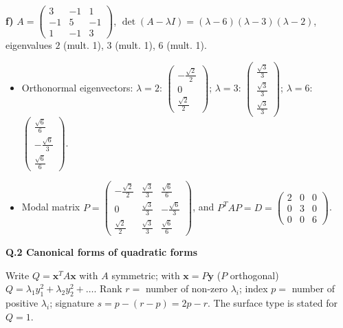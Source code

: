 \noindent\textbf{f)} $A=\begin{pmatrix}3 & -1 & 1 \\ -1 & 5 & -1 \\ 1 & -1 & 3\end{pmatrix}$, $\det(A-\lambda I)=\left(\lambda - 6\right) \left(\lambda - 3\right) \left(\lambda - 2\right)$, eigenvalues $2$ (mult. 1), $3$ (mult. 1), $6$ (mult. 1).
\begin{itemize}\item Orthonormal eigenvectors: $\lambda=2$: $\begin{pmatrix}- \frac{\sqrt{2}}{2} \\ 0 \\ \frac{\sqrt{2}}{2}\end{pmatrix}$; $\lambda=3$: $\begin{pmatrix}\frac{\sqrt{3}}{3} \\ \frac{\sqrt{3}}{3} \\ \frac{\sqrt{3}}{3}\end{pmatrix}$; $\lambda=6$: $\begin{pmatrix}\frac{\sqrt{6}}{6} \\ - \frac{\sqrt{6}}{3} \\ \frac{\sqrt{6}}{6}\end{pmatrix}$.
\item Modal matrix $P=\begin{pmatrix}- \frac{\sqrt{2}}{2} & \frac{\sqrt{3}}{3} & \frac{\sqrt{6}}{6} \\ 0 & \frac{\sqrt{3}}{3} & - \frac{\sqrt{6}}{3} \\ \frac{\sqrt{2}}{2} & \frac{\sqrt{3}}{3} & \frac{\sqrt{6}}{6}\end{pmatrix}$, and $P^TAP=D=\begin{pmatrix}2 & 0 & 0 \\ 0 & 3 & 0 \\ 0 & 0 & 6\end{pmatrix}$.\end{itemize}
\medskip\noindent\textbf{Q.2  Canonical forms of quadratic forms}\par\smallskip
Write $Q=\mathbf x^TA\mathbf x$ with $A$ symmetric; with $\mathbf x=P\mathbf y$ ($P$ orthogonal) $Q=\lambda_1y_1^2+\lambda_2y_2^2+\dots$. Rank $r=$ number of non-zero $\lambda_i$; index $p=$ number of positive $\lambda_i$; signature $s=p-(r-p)=2p-r$. The surface type is stated for $Q=1$.

